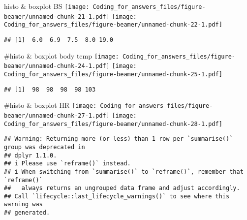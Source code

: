 \documentclass[
  ignorenonframetext,
]{beamer}
\begin{document}
\begin{frame}[fragile]{histo \& boxplot BS}
\label{histo-boxplot-bs}
\texttt{[image: Coding\_for\_answers\_files/figure-beamer/unnamed-chunk-21-1.pdf]}
\texttt{[image: Coding\_for\_answers\_files/figure-beamer/unnamed-chunk-22-1.pdf]}

\begin{verbatim}
## [1]  6.0  6.9  7.5  8.0 19.0
\end{verbatim}

\#histo \& boxplot body temp
\texttt{[image: Coding\_for\_answers\_files/figure-beamer/unnamed-chunk-24-1.pdf]}
\texttt{[image: Coding\_for\_answers\_files/figure-beamer/unnamed-chunk-25-1.pdf]}

\begin{verbatim}
## [1]  98  98  98  98 103
\end{verbatim}

\#histo \& boxplot HR
\texttt{[image: Coding\_for\_answers\_files/figure-beamer/unnamed-chunk-27-1.pdf]}
\texttt{[image: Coding\_for\_answers\_files/figure-beamer/unnamed-chunk-28-1.pdf]}

\begin{verbatim}
## Warning: Returning more (or less) than 1 row per `summarise()` group was deprecated in
## dplyr 1.1.0.
## i Please use `reframe()` instead.
## i When switching from `summarise()` to `reframe()`, remember that `reframe()`
##   always returns an ungrouped data frame and adjust accordingly.
## Call `lifecycle::last_lifecycle_warnings()` to see where this warning was
## generated.
\end{verbatim}


\end{frame}
\end{document}
